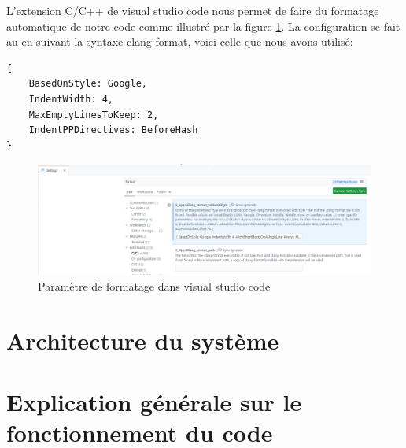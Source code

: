 \documentclass[a4paper]{article}
\begin{document}
L'extension C/C++ de visual studio code nous permet de faire du formatage automatique de notre code comme illustré par la figure \ref{fig:formatting}. La configuration se fait au en suivant la syntaxe clang-format, voici celle que nous avons utilisé:

{\small\begin{verbatim}
{
    BasedOnStyle: Google,
    IndentWidth: 4,
    MaxEmptyLinesToKeep: 2,
    IndentPPDirectives: BeforeHash
}
\end{verbatim}}

\begin{figure}[H]
    \centering
    \includegraphics[width=0.99\linewidth]{../markdown-explanations/images/setup-04.PNG}
    \caption{Paramètre de formatage dans visual studio code}
    \label{fig:formatting}
\end{figure}










\section{Architecture du système}















\section{Explication générale sur le fonctionnement du code}





\end{document}
